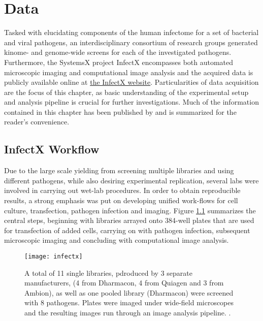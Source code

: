 \chapter{Data}

Tasked with elucidating components of the human infectome for a set of bacterial and viral pathogens, an interdisciplinary consortium of research groups generated kinome- and genome-wide  screens for each of the investigated pathogens. Furthermore, the SystemsX  project InfectX encompasses both automated microscopic imaging and computational image analysis and the acquired data is publicly available online at \href{http://www.infectx.ch/databrowser}{the InfectX website}. Particularities of data acquisition are the focus of this chapter, as basic understanding of the experimental setup and analysis pipeline is crucial for further investigations. Much of the information contained in this chapter has been published by \citet{Ramo2014} and is summarized for the reader's convenience.

\section{InfectX Workflow}
Due to the large scale yielding from screening multiple libraries and using different pathogens, while also desiring experimental replication, several labs were involved in carrying out wet-lab procedures. In order to obtain reproducible results, a strong emphasis was put on developing unified work-flows for cell culture,  transfection, pathogen infection and imaging. Figure \ref{fig:infectx} summarizes the central steps, beginning with  libraries arrayed onto 384-well plates that are used for transfection of added cells, carrying on with pathogen infection, subsequent microscopic imaging and concluding with computational image analysis.

\begin{figure}
  \centering
  \texttt{[image: infectx]}
  \caption[InfectX \acrshort{rnai} data acquisition and analysis workflow.]{A total of 11 single  libraries, pdroduced by 3 separate manufacturers, (4 from Dharmacon, 4 from Quiagen and 3 from Ambion), as well as one pooled library (Dharmacon) were screened with 8 pathogens. Plates were imaged under wide-field microscopes and the resulting images run through an image analysis pipeline. \citep{Ramo2014}.}
  \label{fig:infectx}
\end{figure}

